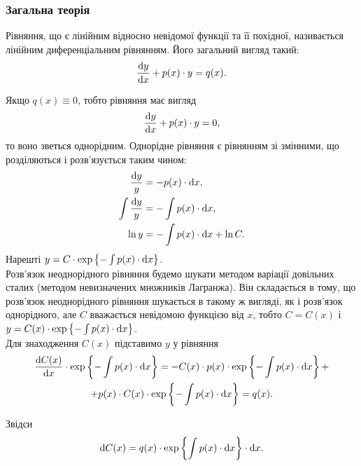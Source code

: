 \subsubsection{Загальна теорія}

Рівняння, що є лінійним відносно невідомої функції та її похідної, називається лінійним диференціальним рівнянням. Його загальний вигляд такий:
\begin{equation}
	\label{eq:1.3.1}
	\frac{\mathop{}\!\mathrm{d} y}{\mathop{}\!\mathrm{d} x} + p(x) \cdot y = q(x).
\end{equation}

Якщо $q(x) \equiv 0$, тобто рівняння має вигляд
\begin{equation}
	\label{eq:1.3.2}
	\frac{\mathop{}\!\mathrm{d} y}{\mathop{}\!\mathrm{d} x} + p(x) \cdot y = 0,
\end{equation}
то воно зветься однорідним. Однорідне рівняння є рівнянням зі змінними, що розділяються і розв’язується таким чином:
\begin{align*}
	\frac{\mathop{}\!\mathrm{d} y}{y} &= -p(x) \cdot \mathop{}\!\mathrm{d} x, \\
	\int \frac{\mathop{}\!\mathrm{d} y}{y} &= - \int p(x) \cdot \mathop{}\!\mathrm{d} x, \\
	\ln y &= - \int p(x) \cdot \mathop{}\!\mathrm{d} x + \ln C.
\end{align*}
Нарешті $y = C \cdot \exp \left\{ - \int p(x) \cdot \mathop{}\!\mathrm{d} x \right\}$. \\

Розв’язок неоднорідного рівняння будемо шукати методом варіації довільних сталих (методом невизначених множників Лагранжа). Він складається в тому, що розв’язок неоднорідного рівняння шукається в такому ж вигляді, як і розв’язок однорідного, але $C$ вважається невідомою функцією від $x$, тобто $C = C(x)$ і $y = C(x) \cdot \exp \left\{ - \int p(x) \cdot \mathop{}\!\mathrm{d} x \right\}$. \\

Для знаходження $C(x)$ підставимо $y$ у рівняння
\begin{multline} 
	\label{eq:1.3.3}
	\frac{\mathop{}\!\mathrm{d} C(x)}{\mathop{}\!\mathrm{d} x} \cdot \exp \left\{ - \int p(x) \cdot \mathop{}\!\mathrm{d} x \right\} = - C(x) \cdot p(x) \cdot \exp \left\{ - \int p(x) \cdot \mathop{}\!\mathrm{d} x \right\} + \\
	+ p(x) \cdot C(x) \cdot \exp \left\{ - \int p(x) \cdot \mathop{}\!\mathrm{d} x \right\} = q(x).
\end{multline}

Звідси
\begin{equation} 
	\label{eq:1.3.4}
	\mathop{}\!\mathrm{d} C(x) = q(x) \cdot \exp \left\{\int p(x) \cdot \mathop{}\!\mathrm{d} x \right\} \cdot \mathop{}\!\mathrm{d} x.
\end{equation}

